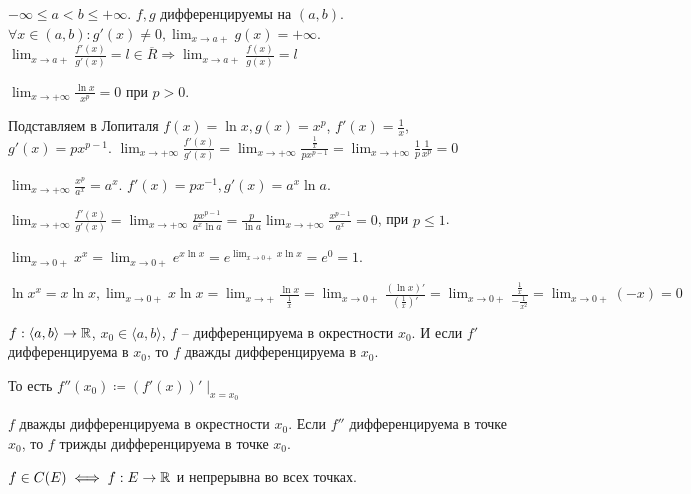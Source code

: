 \begin{theorem}
    $-\infty \le a < b \le +\infty$. $f, g$ дифференцируемы на  $(a, b)$.  $\forall x\in (a, b)\!: g'(x) \neq 0, \lim_{x \to a+}g(x) = +\infty$.  $\lim_{x \to a+} \frac{f'(x)}{g'(x)} =l \in \overline{R} \Rightarrow \lim_{x \to a+} \frac{f(x)}{g(x)} = l$
\end{theorem}
\begin{example}
    $\lim_{x \to +\infty} \frac{\ln x}{x^p} = 0$ при $p > 0$.

    Подставляем в Лопиталя  $f(x) = \ln x, g(x) = x^p$,  $f'(x) = \frac{1}{x}$, $g'(x) = px^{p - 1}$.  $\lim_{x \to + \infty}\frac{f'(x)}{g'(x)} = \lim_{x \to +\infty} \frac{\frac{1}{x}}{px^{p-1}} = \lim_{x \to +\infty} \frac{1}{p} \frac{1}{x^p} = 0$
\end{example}
\begin{example}
    $\lim_{x \to +\infty} \frac{x^p}{a^x} = a^x$. $f'(x) = px^{-1}, g'(x) = a^x \ln a$.

    $\lim_{x \to +\infty} \frac{f'(x)}{g'(x)} = \lim_{x \to +\infty} \frac{px^{p-1}}{a^x \ln a} =  \frac{p}{\ln a} \lim_{x \to +\infty} \frac{x^{p-1}}{a^x} = 0$, при $p \le 1$.
\end{example}
\begin{example}
    $\lim_{x \to 0+} x^x = \lim_{x \to 0+} e^{x \ln x} = e^{\lim_{x \to 0+} x \ln x} = e^0 = 1$.
    
    $\ln x^x = x \ln x, \lim_{x \to 0+} x \ln x = \lim_{x \to +} \frac{\ln x}{\frac{1}{x}} = \lim_{x \to 0+} \frac{(\ln x)'}{(\frac{1}{x})'} = \lim_{x \to 0+} \frac{\frac{1}{x}}{-\frac{1}{x^2}} = \lim_{x \to 0+}(-x) = 0$
\end{example}
\begin{definition}
    $f: \langle a, b \rangle \to \mathbb{R}$,  $x_0 \in \langle a, b \rangle$, $f$ -- дифференцируема в окрестности  $x_0$.
    И если $f'$ дифференцируема в $x_0$, то $f$ дважды дифференцируема в $x_0$.

    То есть $f''(x_0) \coloneqq (f'(x))'\mid_{x=x_0}$
\end{definition}
\begin{definition}
    $f$ дважды дифференцируема в окрестности $x_0$. Если $f''$ дифференцируема в точке  $x_0$, то $f$ трижды дифференцируема в точке  $x_0$. 
\end{definition}
\begin{definition}
    $f \in C(E) \iff f: E \to \mathbb{R}$ и непрерывна во всех точках.
\end{definition}
